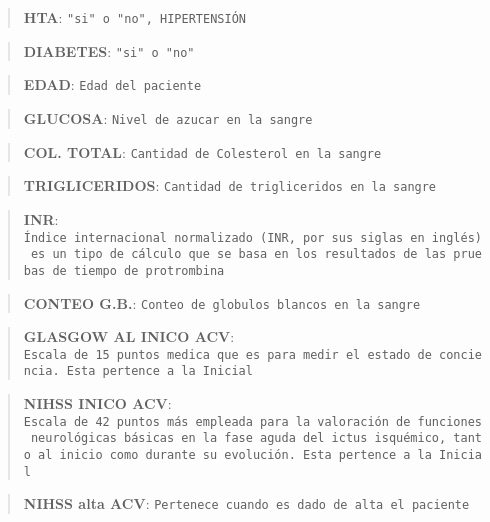     \begin{quote}
\textbf{HTA}: \texttt{"si"\ o\ "no",\ HIPERTENSIÓN}
\end{quote}

\begin{quote}
\textbf{DIABETES}: \texttt{"si"\ o\ "no"}
\end{quote}

\begin{quote}
\textbf{EDAD}: \texttt{Edad\ del\ paciente}
\end{quote}

\begin{quote}
\textbf{GLUCOSA}: \texttt{Nivel\ de\ azucar\ en\ la\ sangre}
\end{quote}

\begin{quote}
\textbf{COL. TOTAL}: \texttt{Cantidad\ de\ Colesterol\ en\ la\ sangre}
\end{quote}

\begin{quote}
\textbf{TRIGLICERIDOS}:
\texttt{Cantidad\ de\ trigliceridos\ en\ la\ sangre}
\end{quote}

\begin{quote}
\textbf{INR}:
\texttt{Índice\ internacional\ normalizado\ (INR,\ por\ sus\ siglas\ en\ inglés)\ es\ un\ tipo\ de\ cálculo\ que\ se\ basa\ en\ los\ resultados\ de\ las\ pruebas\ de\ tiempo\ de\ protrombina}
\end{quote}

\begin{quote}
\textbf{CONTEO G.B.}:
\texttt{Conteo\ de\ globulos\ blancos\ en\ la\ sangre}
\end{quote}

\begin{quote}
\textbf{GLASGOW AL INICO ACV}:
\texttt{Escala\ de\ 15\ puntos\ medica\ que\ es\ para\ medir\ el\ estado\ de\ conciencia.\ Esta\ pertence\ a\ la\ Inicial}
\end{quote}

\begin{quote}
\textbf{NIHSS INICO ACV}:
\texttt{Escala\ de\ 42\ puntos\ más\ empleada\ para\ la\ valoración\ de\ funciones\ neurológicas\ básicas\ en\ la\ fase\ aguda\ del\ ictus\ isquémico,\ tanto\ al\ inicio\ como\ durante\ su\ evolución.\ Esta\ pertence\ a\ la\ Inicial}
\end{quote}

\begin{quote}
\textbf{NIHSS alta ACV}:
\texttt{Pertenece\ cuando\ es\ dado\ de\ alta\ el\ paciente}
\end{quote}

